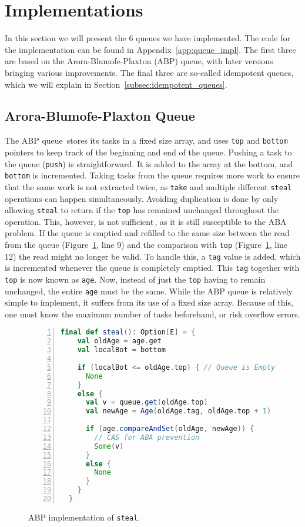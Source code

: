 \section{Implementations}
\label{sec:implementations}
In this section we will present the 6 queues we have implemented. The code for the implementation can be found in Appendix~\ref{app:queue_impl}.
The first three are based on the Arora-Blumofe-Plaxton (ABP) queue, with later versions bringing various improvements.
The final three are so-called idempotent queues, which we will explain in Section~\ref{subsec:idempotent_queues}.

\subsection{Arora-Blumofe-Plaxton Queue}
The ABP queue\,\cite{Arora:1998:TSM:277651.277678} stores its tasks in a fixed size array, and uses \texttt{top} and \texttt{bottom} pointers to keep track of the beginning and end of the queue.
Pushing a task to the queue (\texttt{push}) is straightforward.
It is added to the array at the bottom, and \texttt{bottom} is incremented.
Taking tasks from the queue requires more work to ensure that the same work is not extracted twice, as \texttt{take} and multiple different \texttt{steal} operations can happen simultaneously.
Avoiding duplication is done by only allowing \texttt{steal} to return if the \texttt{top} has remained unchanged throughout the operation. 
This, however, is not sufficient\,\cite{Arora:1998:TSM:277651.277678}, as it is still susceptible to the ABA problem.
If the queue is emptied and refilled to the same size between the read from the queue (Figure~\ref{fig:abpsteal}, line 9) and the comparison with \texttt{top} (Figure~\ref{fig:abpsteal}, line 12) the read might no longer be valid.
To handle this, a \texttt{tag} value is added, which is incremented whenever the queue is completely emptied.
This \texttt{tag} together with \texttt{top} is now known as \texttt{age}.
Now, instead of just the \texttt{top} having to remain unchanged, the entire \texttt{age} must be the same.
While the ABP queue is relatively simple to implement, it suffers from its use of a fixed size array.
Because of this, one must know the maximum number of tasks beforehand, or risk overflow errors.

\begin{figure}
\begin{lstlisting}[language=scala,basicstyle=\ttfamily\bfseries\scriptsize,numbers=left]
final def steal(): Option[E] = {
    val oldAge = age.get
    val localBot = bottom

    if (localBot <= oldAge.top) { // Queue is Empty
      None
    }
    else {
      val v = queue.get(oldAge.top)
      val newAge = Age(oldAge.tag, oldAge.top + 1)

      if (age.compareAndSet(oldAge, newAge)) { 
      	// CAS for ABA prevention
        Some(v)
      }
      else {
        None
      }
    }
  }
\end{lstlisting}
\caption{ABP implementation of \texttt{steal}.}
\label{fig:abpsteal}
\end{figure}

